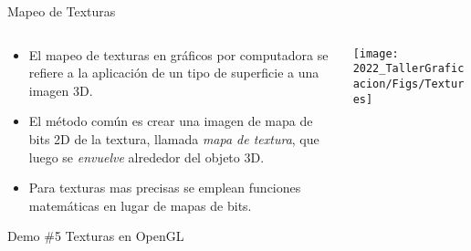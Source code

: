 \begin{frame}{Mapeo de Texturas}
\begin{columns}
\begin{column}{0.6\textwidth}
\begin{itemize}
\item El mapeo de texturas en gráficos por computadora se refiere a la aplicación de un tipo de superficie a una imagen 3D. 
\item El método común es crear una imagen de mapa de bits 2D de la textura, llamada \textit{mapa de textura}, que luego se \textit{envuelve} alrededor del objeto 3D. 
\item Para texturas mas precisas se emplean funciones matemáticas en lugar de mapas de bits.
\end{itemize}
\begin{block}{Demo \#5}
Texturas en OpenGL
\end{block}
\end{column}
\begin{column}{0.4\textwidth}
    \begin{center}
         \texttt{[image: 2022\_TallerGraficacion/Figs/Textures]}
     \end{center}
\end{column}
\end{columns}
\end{frame}

